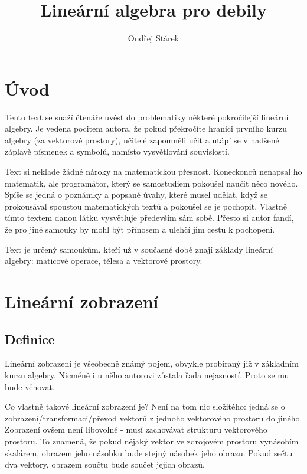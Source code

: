 \documentclass[a5paper,12pt]{amsbook}
\theoremstyle{definition}
\begin{document}
\title{Lineární algebra pro debily}
\author{Ondřej Stárek}
\maketitle

\tableofcontents

\chapter{Úvod}

\noindent Tento text se snaží čtenáře uvést do problematiky některé pokročilejší lineární algebry.
Je vedena pocitem autora, že pokud překročíte hranici prvního kurzu algebry (za vektorové
prostory), učitelé zapomněli učit a utápí se v nadšené záplavě písmenek a symbolů, namísto
vysvětlování souvislostí.

Text si neklade žádné nároky na matematickou přesnost. Koneckonců nenapsal ho matematik,
ale programátor, který se samostudiem pokoušel naučit něco nového. Spíše se jedná o poznámky
a popsané úvahy, které musel udělat, když se prokousával spoustou matematických textů
a pokoušel se je pochopit. Vlastně tímto textem danou látku vysvětluje především sám sobě.
Přesto si autor fandí, že pro jiné samouky by mohl být přínosem a ulehčí jim cestu
k pochopení.

Text je určený samoukům, kteří už v současné době znají základy lineární algebry: maticové
operace, tělesa a vektorové prostory.

\chapter{Lineární zobrazení}

\section{Definice}

\noindent Lineární zobrazení je všeobecně známý pojem, obvykle probíraný již v základním kurzu
algebry. Nicméně i u něho autorovi zůstala řada nejasností. Proto se mu bude věnovat.

Co vlastně takové lineární zobrazení je? Není na tom nic složitého: jedná se
o zobrazení/transformaci/převod vektorů z jednoho vektorového prostoru do jiného. Zobrazení ovšem
není libovolné - musí zachovávat strukturu vektorového prostoru. To znamená, že pokud nějaký vektor
ve zdrojovém prostoru vynásobím skalárem, obrazem jeho násobku bude stejný násobek jeho obrazu. Pokud
sečtu dva vektory, obrazem součtu bude součet jejich obrazů. 
\end{document}
